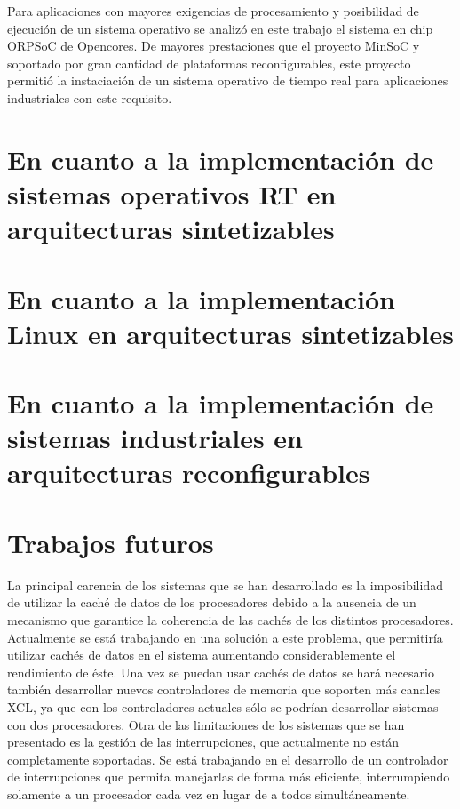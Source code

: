 Para aplicaciones con mayores exigencias de procesamiento y posibilidad de ejecución de un sistema operativo se analizó en este trabajo el sistema en
chip ORPSoC de Opencores. De mayores prestaciones que el proyecto MinSoC y soportado por gran cantidad de plataformas reconfigurables, este proyecto
permitió la instaciación de un sistema operativo de tiempo real para aplicaciones industriales con este requisito.
		
	\section{En cuanto a la implementación de sistemas operativos RT en arquitecturas sintetizables} 
		

	
	\section{En cuanto a la implementación Linux en arquitecturas sintetizables} 
		
		
		

	\section{En cuanto a la implementación de sistemas industriales en arquitecturas reconfigurables} 



	\section{Trabajos futuros}

La principal carencia de los sistemas que se han desarrollado es la imposibilidad de utilizar la caché de datos de los procesadores debido a la
ausencia de un mecanismo que garantice la coherencia de las cachés de los distintos procesadores. Actualmente se está trabajando en una solución a
este problema, que permitiría utilizar cachés de datos en el sistema aumentando considerablemente el rendimiento de éste. Una vez se puedan usar
cachés de datos se hará necesario también desarrollar nuevos controladores de memoria que soporten más canales XCL, ya que con los controladores
actuales sólo se podrían desarrollar sistemas con dos procesadores. Otra de las limitaciones de los sistemas que se han presentado es la gestión de
las interrupciones, que actualmente no están completamente soportadas. Se está trabajando en el desarrollo de un controlador de interrupciones que
permita manejarlas de forma más eficiente, interrumpiendo solamente a un procesador cada vez en lugar de a todos simultáneamente.

